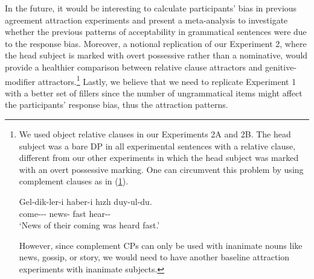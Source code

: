 In the future, it would be interesting to calculate participants' bias in previous agreement attraction experiments and present a meta-analysis to investigate whether the previous patterns of acceptability in grammatical sentences were due to the response bias. Moreover, a notional replication of our Experiment 2, where the head subject is marked with overt possessive rather than a nominative, would provide a healthier comparison between relative clause attractors and genitive-modifier attractors.\footnote{We used object relative clauses in our Experiments 2A and 2B. The head subject was a bare DP in all experimental sentences with a relative clause, different from our other experiments in which the head subject was marked with an overt possessive marking. One can circumvent this problem by using complement clauses as in (\ref{ex:complementCP}). 

\ea \label{ex:complementCP} 
\gll Gel-dik-ler-i haber-i h{\i}zl{\i} duy-ul-du.\\
come-\Nmlz{}-\Tpl{}-\Poss{} news-\Poss{} fast hear-\Pass{}-\Pst{}\\
\glt `News of their coming was heard fast.'
\z

However, since complement CPs can only be used with inanimate nouns like news, gossip, or story, we would need to have another baseline attraction experiments with inanimate subjects.} Lastly, we believe that we need to replicate Experiment 1 with a better set of fillers since the number of ungrammatical items might affect the participants' response bias, thus the attraction patterns. 
